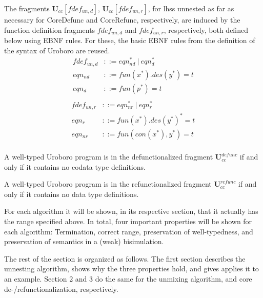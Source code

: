 \begin{definition}
The fragments $\mathbf{U}_{cc}[fdef_{un,d}]$, $\mathbf{U}_{cc}[fdef_{un,r}]$, for lhss unnested as far as necessary for \textsf{CoreDefunc} and \textsf{CoreRefunc}, respectively, are induced by the function definition fragments $fdef_{un,d}$ and $fdef_{un,r}$, respectively, both defined below using EBNF rules. For these, the basic EBNF rules from the definition of the syntax of Uroboro are reused.
\begin{align*}
fdef_{un,d} &::= eqn_{nd}^* ~ | ~ eqn_d^* \\
eqn_{nd} &::= fun(x^*).des(y^*) = t \\
eqn_d &::= fun(p^*) = t \\
\end{align*}
\begin{align*}
fdef_{un,r} &::= eqn_{nr}^* ~ | ~ eqn_r^* \\
eqn_r &::= fun(x^*).des(y^*)^* = t \\
eqn_{nr} &::= fun(con(x^*), y^*) = t \\
\end{align*}
\end{definition}

\begin{definition}
A well-typed Uroboro program is in the defunctionalized fragment $\mathbf{U}^{defunc}_{cc}$ if and only if it contains no codata type definitions.
\end{definition}

\begin{definition}
A well-typed Uroboro program is in the refunctionalized fragment $\mathbf{U}^{refunc}_{cc}$ if and only if it contains no data type definitions.
\end{definition}

For each algorithm it will be shown, in its respective section, that it actually has the range specified above. In total, four important properties will be shown for each algorithm: Termination, correct range, preservation of well-typedness, and preservation of semantics in a (weak) bisimulation.

The rest of the section is organized as follows. The first section describes the unnesting algorithm, shows why the three properties hold, and gives applies it to an example. Section 2 and 3 do the same for the unmixing algorithm, and core de-/refunctionalization, respectively.

